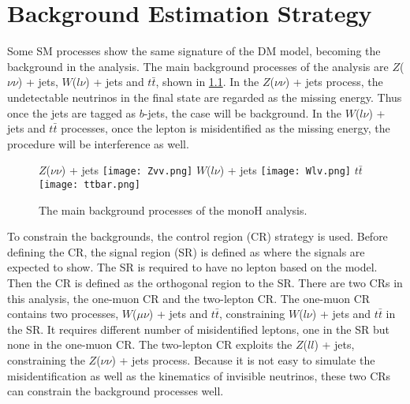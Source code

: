 \documentclass[class=NTHU_thesis, crop=false]{standalone}
\begin{document}
\chapter{Background Estimation Strategy}
\label{chap:estimation_strategy}
Some SM processes show the same signature of the DM model, becoming the background in the analysis. The main background processes of the analysis are $Z$($\nu\nu$) + jets, $W$($l\nu$) + jets and $t\bar{t}$, shown in \cref{fig:Bkg-Processes}. In the $Z$($\nu\nu$) + jets process, the undetectable neutrinos in the final state are regarded as the missing energy. Thus once the jets are tagged as $b$-jets, the case will be background. In the $W$($l\nu$) + jets and $t\bar{t}$ processes, once the lepton is misidentified as the missing energy, the procedure will be interference as well.

\begin{figure}[!hbt]
	\captionsetup[subfigure]{labelformat=empty}
	\centering
	\subcaptionbox
	{$Z$($\nu\nu$) + jets
		\label{fig:Bkg-Processes-fig1}}
		{\texttt{[image: Zvv.png]}}
	\subcaptionbox
	{$W$($l\nu$) + jets
		\label{fig:Bkg-Processes-fig2}}
		{\texttt{[image: Wlv.png]}}
	\subcaptionbox
	{$t\bar{t}$
		\label{fig:Bkg-Processes-fig3}}
		{\texttt{[image: ttbar.png]}}
	\caption{The main background processes of the monoH analysis.}
	\label{fig:Bkg-Processes}
\end{figure}

To constrain the backgrounds, the control region (CR) strategy is used. Before defining the CR, the signal region (SR) is defined as where the signals are expected to show. The SR is required to have no lepton based on the model. Then the CR is defined as the orthogonal region to the SR. There are two CRs in this analysis, the one-muon CR and the two-lepton CR. The one-muon CR contains two processes, $W$($\mu\nu$) + jets and $t\bar{t}$, constraining $W$($l\nu$) + jets and $t\bar{t}$ in the SR. It requires different number of misidentified leptons, one in the SR but none in the one-muon CR. The two-lepton CR exploits the $Z$($ll$) + jets, constraining the $Z$($\nu\nu$) + jets process. Because it is not easy to simulate the misidentification as well as the kinematics of invisible neutrinos, these two CRs can constrain the background processes well.
\end{document}
